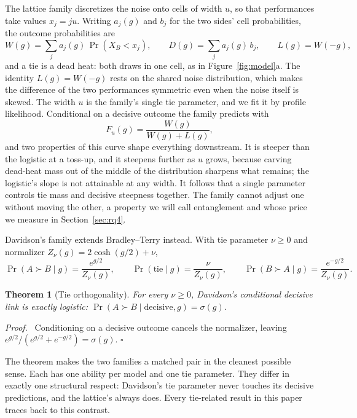 \documentclass[10pt]{article}
\newtheorem{theorem}{Theorem}
\newenvironment{proof}{\par\noindent\textit{Proof.}\ }{\hfill$\square$\par}
\begin{document}
The lattice family discretizes the noise onto cells of width $u$, so
that performances take values $x_j = ju$. Writing $a_j(g)$ and $b_j$
for the two sides' cell probabilities, the outcome probabilities are
\begin{equation}\label{eq:lattice}
W(g) = \sum_j a_j(g)\,\Pr(X_B < x_j), \qquad
D(g) = \sum_j a_j(g)\, b_j, \qquad
L(g) = W(-g),
\end{equation}
and a tie is a dead heat: both draws in one cell, as in
Figure~\ref{fig:model}a. The identity $L(g) = W(-g)$ rests on the
shared noise distribution, which makes the difference of the two
performances symmetric even when the noise itself is skewed. The
width $u$ is the family's single tie
parameter, and we fit it by profile likelihood. Conditional on a
decisive outcome the family predicts with
\begin{equation}\label{eq:fdec}
F_u(g) = \frac{W(g)}{W(g)+L(g)},
\end{equation}
and two properties of this curve shape everything downstream. It is
steeper than the logistic at a toss-up, and it steepens further as
$u$ grows, because carving dead-heat mass out of the middle of the
distribution sharpens what remains; the logistic's slope is not
attainable at any width. It follows that a single parameter controls
tie mass and decisive steepness together. The family cannot adjust
one without moving the other, a property we will call entanglement
and whose price we measure in Section~\ref{sec:rq4}.

Davidson's family extends Bradley--Terry instead. With tie parameter
$\nu \geq 0$ and normalizer $Z_\nu(g) = 2\cosh(g/2) + \nu$,
\begin{equation}\label{eq:davidson}
\Pr(A \succ B \mid g) = \frac{e^{g/2}}{Z_\nu(g)}, \qquad
\Pr(\text{tie} \mid g) = \frac{\nu}{Z_\nu(g)}, \qquad
\Pr(B \succ A \mid g) = \frac{e^{-g/2}}{Z_\nu(g)}.
\end{equation}

\begin{theorem}[Tie orthogonality]\label{thm:orth}
For every $\nu \geq 0$, Davidson's conditional decisive link is
exactly logistic: $\Pr(A \succ B \mid \mathrm{decisive}, g) =
\sigma(g)$.
\end{theorem}

\begin{proof}
Conditioning on a decisive outcome cancels the normalizer, leaving
$e^{g/2}/(e^{g/2} + e^{-g/2}) = \sigma(g)$.
\end{proof}

The theorem makes the two families a matched pair in the cleanest
possible sense. Each has one ability per model and one tie parameter.
They differ in exactly one structural respect: Davidson's tie
parameter never touches its decisive predictions, and the lattice's
always does. Every tie-related result in this paper traces back to
this contrast.
\end{document}
